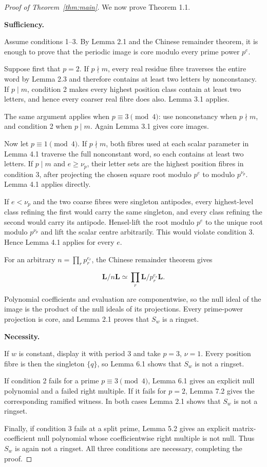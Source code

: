 \documentclass[11pt]{article}
\numberwithin{equation}{section}
\begin{document}
\begin{proof}[Proof of Theorem~\ref{thm:main}]

We now prove Theorem 1.1.

\medskip
\noindent\textbf{Sufficiency.}

Assume conditions 1--3. By Lemma 2.1 and the Chinese remainder theorem, it
is enough to prove that the periodic image is core modulo every prime power
$p^e$.

Suppose first that $p=2$. If $p\nmid m$, every real residue fibre traverses
the entire word by Lemma 2.3 and therefore contains at least two letters by
nonconstancy. If $p\mid m$, condition 2 makes every highest position class
contain at least two letters, and hence every coarser real fibre does also.
Lemma 3.1 applies.

The same argument applies when $p\equiv3\pmod4$: use nonconstancy when
$p\nmid m$, and condition 2 when $p\mid m$. Again Lemma 3.1 gives core
images.

Now let $p\equiv1\pmod4$. If $p\nmid m$, both fibres used at each scalar
parameter in Lemma 4.1 traverse the full nonconstant word, so each contains
at least two letters. If $p\mid m$ and $e\ge\nu_p$, their letter sets are
the highest position fibres in condition 3, after projecting the chosen
square root modulo $p^e$ to modulo $p^{\nu_p}$. Lemma 4.1 applies directly.

If $e<\nu_p$ and the two coarse fibres were singleton antipodes, every
highest-level class refining the first would carry the same singleton, and
every class refining the second would carry its antipode. Hensel-lift the
root modulo $p^e$ to the unique root modulo $p^{\nu_p}$ and lift the scalar
centre arbitrarily. This would violate condition 3. Hence Lemma 4.1 applies
for every $e$.

For an arbitrary $n=\prod_rp_r^{e_r}$, the Chinese remainder theorem gives

\nopagebreak[4]
\[
\mathbf L/n\mathbf L
\simeq\prod_r\mathbf L/p_r^{e_r}\mathbf L.
\]

Polynomial coefficients and evaluation are componentwise, so the null ideal
of the image is the product of the null ideals of its projections. Every
prime-power projection is core, and Lemma 2.1 proves that $S_w$ is a
ringset.

\medskip
\noindent\textbf{Necessity.}

If $w$ is constant, display it with period $3$ and take $p=3$, $\nu=1$.
Every position fibre is then the singleton $\{q\}$, so Lemma 6.1 shows that
$S_w$ is not a ringset.

If condition 2 fails for a prime $p\equiv3\pmod4$, Lemma 6.1 gives an
explicit null polynomial and a failed right multiple. If it fails for
$p=2$, Lemma 7.2 gives the corresponding ramified witness. In both cases
Lemma 2.1 shows that $S_w$ is not a ringset.

Finally, if condition 3 fails at a split prime, Lemma 5.2 gives an explicit
matrix-coefficient null polynomial whose coefficientwise right multiple is
not null. Thus $S_w$ is again not a ringset. All three conditions are
necessary, completing the proof.
\end{proof}
\end{document}
